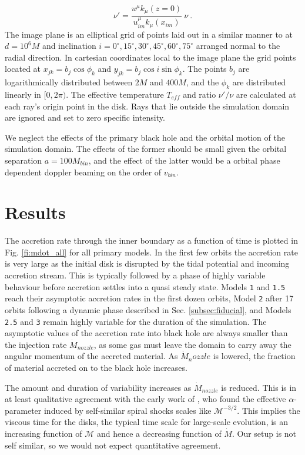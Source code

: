 \documentclass{emulateapj}
\newcommand{\al}{\alpha}
\newcommand{\model}[1]{{Model \texttt{#1}}}
\begin{document}
\begin{equation}
	\nu' = \frac{u^\mu k_\mu(z=0)}{u^\mu_{im} k_\mu(x_{im})} \ \nu \ .
\end{equation}
The image plane is an elliptical grid of points laid out in a similar manner to \cite{Kulkarni11} at $d=10^6M$ and inclination $i = 0^\circ, 15^\circ, 30^\circ, 45^\circ, 60^\circ, 75^\circ$ arranged normal to the radial direction.  In cartesian coordinates local to the image plane the grid points located at $x_{jk} = b_j \cos \phi_k$ and $y_{jk} = b_j \cos i \sin \phi_k$.  The points $b_j$ are logarithmically distributed between $2M$ and $400M$, and the  $\phi_k$ are distributed linearly in $[0, 2\pi)$. The effective temperature $T_{eff}$ and ratio $\nu' / \nu$ are calculated at each ray's origin point in the disk.  Rays that lie outside the simulation domain are ignored and set to zero specific intensity.

We neglect the effects of the primary black hole and the orbital motion of the simulation domain.  The effects of the former should be small given the orbital separation $a = 100M_{bin}$, and the effect of the latter would be a orbital phase dependent doppler beaming on the order of $v_{bin}$.



\section{Results}
\label{sec:results}
{\color{red} 
The accretion rate through the inner boundary as a function of time is plotted in Fig. \ref{fi:mdot_all} for all primary models.  In the first few orbits the accretion rate is very large as the initial disk is disrupted by the tidal potential and incoming accretion stream.  This is typically followed by a phase of highly variable behaviour before accretion settles into a quasi steady state.  Models \texttt{1} and \texttt{1.5} reach their asymptotic accretion rates in the first dozen orbits, \model{2} after 17 orbits following a dynamic phase described in Sec. \ref{subsec:fiducial}, and Models \texttt{2.5} and \texttt{3} remain highly variable for the duration of the simulation.  The asymptotic values of the accretion rate into black hole are always smaller than the injection rate $\dot{M}_{nozzle}$, as some gas must leave the domain to carry away the angular momentum of the accreted material.  As $\dot{M}_nozzle$ is lowered, the fraction of material accreted on to the black hole increases.

The amount and duration of variability increases as $\dot{M}_{nozzle}$ is reduced.  This is in at least qualitative agreement with the early work of \cite{Spruit87}, who found the effective $\al$-parameter induced by self-similar spiral shocks scales like $\mathcal{M}^{-3/2}$.  This implies the viscous time for the disks, the typical time scale for large-scale evolution, is an increasing function of $\mathcal{M}$ and hence a decreasing function of $\dot{M}$.  Our setup is not self similar, so we would not expect quantitative agreement.
}
\end{document}
